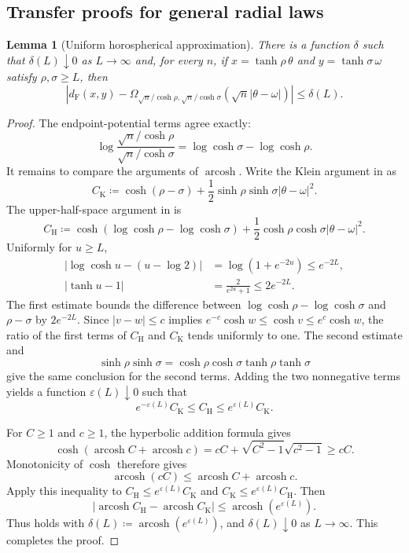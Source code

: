\documentclass[10pt,a4paper]{amsart}
\numberwithin{equation}{section}
\newtheorem{lemma}[theorem]{Lemma}
\DeclareMathOperator{\arcosh}{arcosh}
\newcommand{\dF}{d_{\mathrm F}}
\begin{document}
\subsection{Transfer proofs for general radial laws}\label{app:general-transfer-proofs}

\begin{lemma}[Uniform horospherical approximation]
\label{lem:general-horospherical-approximation}
There is a function $\delta$ such that $\delta(L)\downarrow0$ as $L\to\infty$ and, for every $n$, if
$x=\tanh\rho\,\theta$ and $y=\tanh\sigma\,\omega$ satisfy $\rho,\sigma\ge L$, then
\begin{equation}\label{eq:general-horospherical-approximation}
 \left|
 \dF(x,y)-
 \Omega_{\sqrt n/\cosh\rho,\sqrt n/\cosh\sigma}
        (\sqrt n|\theta-\omega|)
 \right|
 \le\delta(L).
\end{equation}
\end{lemma}

\begin{proof}
The endpoint-potential terms agree exactly:
\[
 \log\frac{\sqrt n/\cosh\rho}{\sqrt n/\cosh\sigma}
 =\log\cosh\sigma-\log\cosh\rho.
\]
It remains to compare the arguments of $\arcosh$.  Write the Klein argument in  as
\[
 C_{\mathrm K}
 \coloneqq\cosh(\rho-\sigma)
  +\frac12\sinh\rho\sinh\sigma|\theta-\omega|^2.
\]
The upper-half-space argument in  is
\[
 C_{\mathrm H}
 \coloneqq\cosh(\log\cosh\rho-\log\cosh\sigma)
  +\frac12\cosh\rho\cosh\sigma|\theta-\omega|^2.
\]
Uniformly for $u\ge L$,
\[
 \begin{aligned}
 \left|\log\cosh u-(u-\log2)\right|
 &=\log(1+e^{-2u})\le e^{-2L},\\
 |\tanh u-1|&=\frac{2}{e^{2u}+1}\le2e^{-2L}.
 \end{aligned}
\]
The first estimate bounds the difference between $\log\cosh\rho-\log\cosh\sigma$ and $\rho-\sigma$ by $2e^{-2L}$.
Since $|v-w|\le c$ implies $e^{-c}\cosh w\le\cosh v\le e^c\cosh w$, the ratio of the first terms of
$C_{\mathrm H}$ and $C_{\mathrm K}$ tends uniformly to one.  The second estimate and
\[
 \sinh\rho\sinh\sigma
 =\cosh\rho\cosh\sigma\tanh\rho\tanh\sigma
\]
give the same conclusion for the second terms.  Adding the two nonnegative terms yields a function
$\varepsilon(L)\downarrow0$ such that
\[
 e^{-\varepsilon(L)}C_{\mathrm K}
 \le C_{\mathrm H}
 \le e^{\varepsilon(L)}C_{\mathrm K}.
\]

For $C\ge1$ and $c\ge1$, the hyperbolic addition formula gives
\[
 \cosh(\arcosh C+\arcosh c)
 =cC+\sqrt{C^2-1}\sqrt{c^2-1}\ge cC.
\]
Monotonicity of $\cosh$ therefore gives
\[
 \arcosh(cC)\le\arcosh C+\arcosh c.
\]
Apply this inequality to $C_{\mathrm H}\le e^{\varepsilon(L)}C_{\mathrm K}$ and
$C_{\mathrm K}\le e^{\varepsilon(L)}C_{\mathrm H}$.  Then
\[
 |\arcosh C_{\mathrm H}-\arcosh C_{\mathrm K}|
 \le\arcosh(e^{\varepsilon(L)}).
\]
Thus  holds with
$\delta(L)\coloneqq\arcosh(e^{\varepsilon(L)})$, and $\delta(L)\downarrow0$ as $L\to\infty$.
This completes the proof.
\end{proof}
\end{document}
